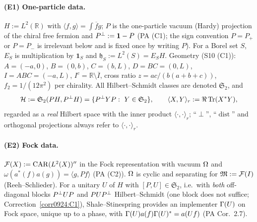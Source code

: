 \documentclass[11pt]{article}
\newcommand{\Stwo}{\mathfrak S_2}\newcommand{\Sone}{\mathfrak S_1}
\newcommand{\ip}[2]{\langle #1,#2\rangle}\newcommand{\one}{\mathbf 1}
\DeclareMathOperator{\dist}{dist}\DeclareMathOperator{\Var}{Var}
\begin{document}
\paragraph{(E1) One-particle data.}
$H:=L^2(\mathbb R)$ with $\ip fg=\int\overline fg$; $P$ is the one-particle vacuum (Hardy)
projection of the chiral free fermion and $\Pperp:=\one-P$ (PA (C1); the sign convention
$P=P_+$ or $P=P_-$ is irrelevant below and is fixed once by writing $P$).  For a Borel set
$S$, $E_S$ is multiplication by $\one_S$ and $\mathfrak h_S:=L^2(S)=E_SH$.  Geometry (S10 (C1)):
$A=(-a,0)$, $B=(0,b)$, $C=(b,L)$, $D=BC=(0,L)$, $I=ABC=(-a,L)$, $I^c=\mathbb R\setminus
\overline I$, cross ratio $z=ac/(b(a+b+c))$, $f_2=1/(12\pi^2)$ per chirality.  All
Hilbert--Schmidt classes are denoted $\Stwo$, and
\begin{equation}\label{eq:realHS}
 \cH:=\Stwo(PH,\Pperp H)=\{\Pperp Y P:\ Y\in\Stwo\},\qquad
 \ip XY_r:=\Re\Tr(X^*Y),
\end{equation}
regarded as a \emph{real} Hilbert space with the inner product $\ip\cdot\cdot_r$; ``$\perp$'',
``$\dist$'' and orthogonal projections always refer to $\ip\cdot\cdot_r$.

\paragraph{(E2) Fock data.}
$\mathcal F(X):=\mathrm{CAR}(L^2(X))''$ in the Fock representation with vacuum $\Omega$ and
$\omega(a^*(f)a(g))=\ip g{Pf}$ (PA (C2)).  $\Omega$ is cyclic and separating for $\mathfrak M:=\mathcal F(I)$
(Reeh--Schlieder).  For a unitary $U$ of $H$ with $[P,U]\in\Stwo$, i.e.\ with \emph{both} off-diagonal blocks $P^{\perp} UP$ and $PUP^{\perp}$ Hilbert--Schmidt (one block does not suffice; Correction~\ref{corr0924:C1}), Shale--Stinespring
provides an implementer $\Gamma(U)$ on Fock space, unique up to a phase, with
$\Gamma(U)a(f)\Gamma(U)^*=a(Uf)$ (PA Cor.~2.7).
\end{document}
